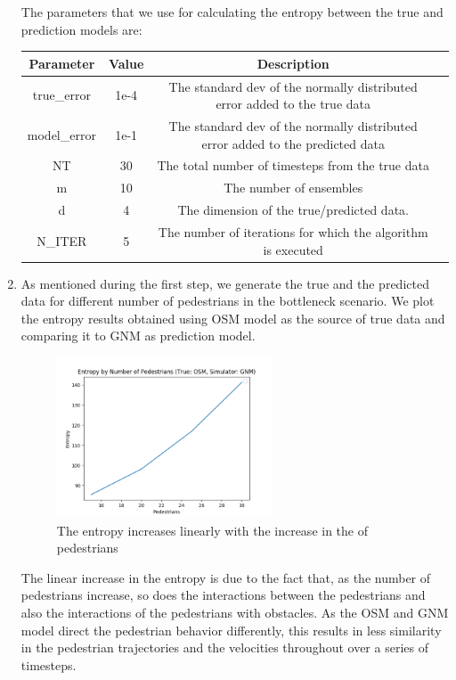 \documentclass[10pt,a4paper]{article}
\begin{document}
\begin{enumerate}
	The parameters that we use for calculating the entropy between the true and prediction models are:
	 \begin{center}
	\begin{tabular}{ |c|c|c|c| } 
	\hline
	Parameter & Value & Description \\
	\hline\hline
	true\_error & 1e-4 & The standard dev of the normally distributed error added to the true data \\ 
	model\_error & 1e-1 & The standard dev of the normally distributed error added to the predicted data \\ 
	NT & 30 & The total number of timesteps from the true data \\ 
	m & 10 & The number of ensembles \\ 
	d & 4 & The dimension of the true/predicted data. \\ 
	N\_ITER & 5 & The number of iterations for which the algorithm is executed \\ 
	\hline
\end{tabular}
\end{center}
	\item As mentioned during the first step, we generate the true and the predicted data for different number of pedestrians in the bottleneck scenario. We plot the entropy results obtained using OSM model as the source of true data and comparing it to GNM as prediction model.
	\begin{figure}[H]
    \centering
    \includegraphics[width=0.6\textwidth]{pictures/task5/osm_gnm.png}
    \caption{The entropy increases linearly with the increase in the of pedestrians}
    \label{fig:osm_gnm}
	\end{figure}
The linear increase in the entropy is due to the fact that, as the number of pedestrians increase, so does the interactions between the pedestrians and also the interactions of the pedestrians with obstacles. As the OSM and GNM model direct the pedestrian behavior differently, this results in less similarity in the pedestrian trajectories and the velocities throughout over a series of timesteps.

\end{enumerate}
\end{document}
